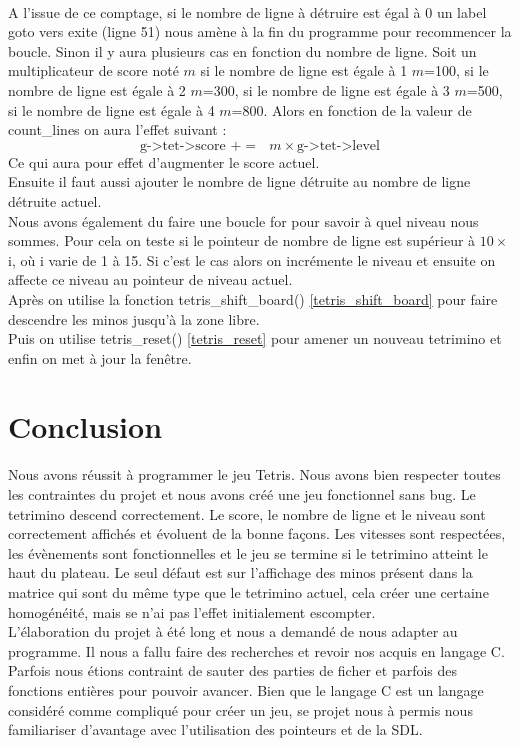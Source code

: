 \documentclass[a4paper,10p]{report}
\begin{document}
\\A l’issue de ce comptage, si le nombre de ligne à détruire est égal à 0 un label goto vers exite (ligne \textcolor{gris}{51}) nous amène à la fin du programme pour recommencer la boucle. Sinon il y aura plusieurs cas en fonction du nombre de ligne. Soit un multiplicateur de score noté $m$ si le nombre de ligne est égale à 1 $m$=100, si le nombre de ligne est égale à 2 $m$=300, si le nombre de ligne est égale à 3 $m$=500, si le nombre de ligne est égale à 4 $m$=800. Alors en fonction de la valeur de count\_lines on aura l'effet suivant :
\begin{equation*}
    \text{g->tet->score $+=$ $m \times$g->tet->level}
\end{equation*}
Ce qui aura pour effet d'augmenter le score actuel.
\\Ensuite il faut aussi ajouter le nombre de ligne détruite au nombre de ligne détruite actuel.
\\Nous avons également du faire une boucle for pour savoir à quel niveau nous sommes. Pour cela on teste si le pointeur de nombre de ligne est supérieur à $10\times$i, où i varie de 1 à 15. Si c'est le cas alors on incrémente le niveau et ensuite on affecte ce niveau au pointeur de niveau actuel.
\\Après on utilise la fonction tetris\_shift\_board() \ref{tetris_shift_board} pour faire descendre les minos jusqu'à la zone libre.
\\Puis on utilise tetris\_reset() \ref{tetris_reset} pour amener un nouveau tetrimino et enfin on met à jour la fenêtre.

\chapter{Conclusion}
Nous avons réussit à programmer le jeu Tetris. Nous avons bien respecter toutes les contraintes du projet et nous avons créé une jeu fonctionnel sans bug. Le tetrimino descend correctement. Le score, le nombre de ligne et le niveau sont correctement affichés et évoluent de la bonne façons. Les vitesses sont respectées, les évènements sont fonctionnelles et le jeu se termine si le tetrimino atteint le haut du plateau. Le seul défaut est sur l'affichage des minos présent dans la matrice qui sont du même type que le tetrimino actuel, cela créer une certaine homogénéité, mais se n'ai pas l'effet initialement escompter.
\\L'élaboration du projet à été long et nous a demandé de nous adapter au programme. Il nous a fallu faire des recherches et revoir nos acquis en langage C. Parfois nous étions contraint de sauter des parties de ficher et parfois des fonctions entières pour pouvoir avancer. Bien que le langage C est un langage considéré comme compliqué pour créer un jeu, se projet nous à permis nous familiariser d'avantage avec l'utilisation des pointeurs et de la SDL.
\end{document}
